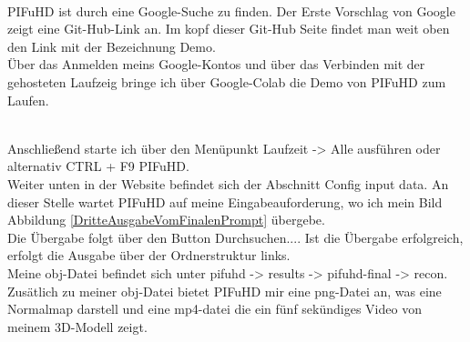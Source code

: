\\
PIFuHD ist durch eine Google-Suche zu finden. Der Erste Vorschlag von Google zeigt eine Git-Hub-Link an. Im kopf dieser Git-Hub Seite findet man weit oben den Link mit der Bezeichnung Demo.
\\
Über das Anmelden meins Google-Kontos und über das Verbinden mit der gehosteten Laufzeig bringe ich über Google-Colab die Demo von PIFuHD zum Laufen.

\\
Anschließend starte ich über den Menüpunkt Laufzeit -> Alle ausführen oder alternativ CTRL + F9 PIFuHD.
\\
Weiter unten in der Website befindet sich der Abschnitt Config input data. An dieser Stelle wartet PIFuHD auf meine Eingabeauforderung, wo ich mein Bild Abbildung \ref{DritteAusgabeVomFinalenPrompt} übergebe.
\\
Die Übergabe folgt über den Button Durchsuchen.... Ist die Übergabe erfolgreich, erfolgt die Ausgabe über der Ordnerstruktur links.
\\
Meine obj-Datei befindet sich unter pifuhd -> results -> pifuhd-final -> recon. Zusätlich zu meiner obj-Datei bietet PIFuHD mir eine png-Datei an, was eine Normalmap darstell und eine mp4-datei die ein fünf sekündiges Video von meinem 3D-Modell zeigt.
\\

